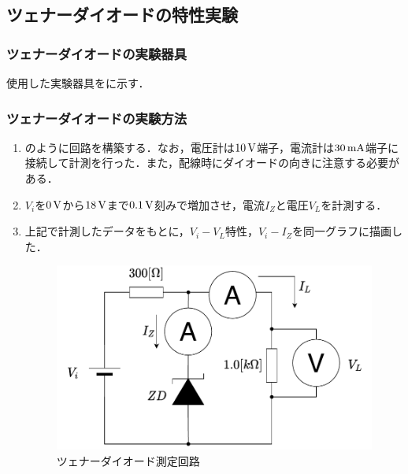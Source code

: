 \clearpage
\subsection{ツェナーダイオードの特性実験}
\subsubsection{ツェナーダイオードの実験器具}
使用した実験器具をに示す．
\begin{table}[h]
  \centering
  \caption{実験装置}
  \label{tab:kigu2}
\end{table}

\subsubsection{ツェナーダイオードの実験方法}
\begin{enumerate}[(1)]
\item {}のように回路を構築する．なお，電圧計は$10\,\rm{V}$端子，電流計は$30\,\rm{mA}$端子に接続して計測を行った．また，配線時にダイオードの向きに注意する必要がある．
\item $V_{i}$を$0\,\rm{V}$から$18\,\rm{V}$まで$0.1\,\rm{V}$刻みで増加させ，電流$I_{Z}$と電圧$V_{L}$を計測する．
\item 上記で計測したデータをもとに，$V_{i}-V_{L}$特性，$V_{i}-I_{Z}$を同一グラフに描画した．
\begin{figure}[h]
\centering
\includegraphics[scale=0.7]{./fig/zenerc.pdf}
\caption{ツェナーダイオード測定回路}
\label{fig:zenerc}
\end{figure}
\end{enumerate}

